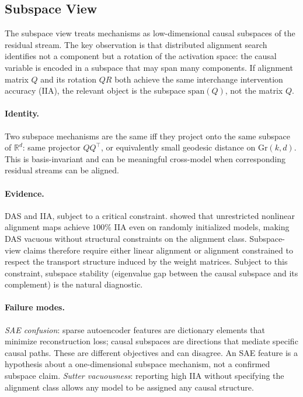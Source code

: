 \documentclass[11pt]{article}
\theoremstyle{remark}
\newcommand{\Gr}{\mathrm{Gr}}
\begin{document}
\subsection{Subspace View}

The subspace view treats mechanisms as low-dimensional causal subspaces
of the residual stream.  The key observation is that distributed
alignment search \citep{geiger2021,geiger2024} identifies not a component
but a rotation of the activation space: the causal variable is encoded
in a subspace that may span many components.  If alignment matrix $Q$
and its rotation $QR$ both achieve the same interchange intervention
accuracy (IIA), the relevant object is the subspace $\mathrm{span}(Q)$,
not the matrix $Q$.

\paragraph{Identity.}
Two subspace mechanisms are the same iff they project onto the same
subspace of $\mathbb{R}^d$: same projector $QQ^\top$, or equivalently
small geodesic distance on $\Gr(k,d)$.  This is basis-invariant and
can be meaningful cross-model when corresponding residual streams can
be aligned.

\paragraph{Evidence.}
DAS and IIA, subject to a critical constraint.  \citet{sutter2025}
showed that unrestricted nonlinear alignment maps achieve $100\%$ IIA
even on randomly initialized models, making DAS vacuous without
structural constraints on the alignment class.  Subspace-view claims
therefore require either linear alignment or alignment constrained to
respect the transport structure induced by the weight matrices.  Subject
to this constraint, subspace stability (eigenvalue gap between the causal
subspace and its complement) is the natural diagnostic.

\paragraph{Failure modes.}
\emph{SAE confusion}: sparse autoencoder features are dictionary elements
that minimize reconstruction loss; causal subspaces are directions that
mediate specific causal paths.  These are different objectives and can
disagree.  An SAE feature is a hypothesis about a one-dimensional
subspace mechanism, not a confirmed subspace claim.  \emph{Sutter vacuousness}:
reporting high IIA without specifying the alignment class allows any
model to be assigned any causal structure.
\end{document}
